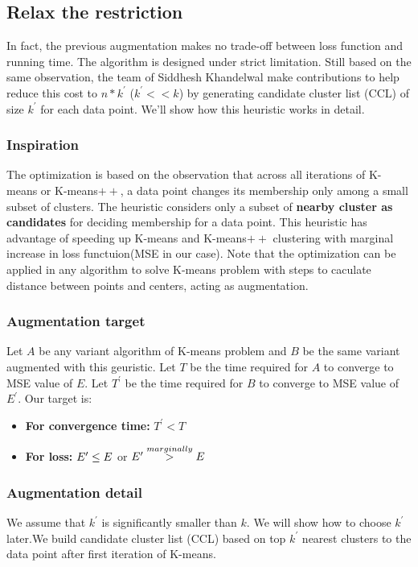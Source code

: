\documentclass[11pt]{article}
\begin{document}
\subsection{Relax the restriction}
In fact, the previous augmentation makes no trade-off between loss function and running time. The algorithm is designed under strict limitation. Still based on the same observation, the team of Siddhesh Khandelwal\cite{Faster} make contributions to help reduce this cost to $n * k^{\prime}$ ($k^{\prime} << k$) by generating candidate cluster list (CCL) of size $k^{\prime}$ for each data point. We'll show how this heuristic works in detail.
\subsubsection{Inspiration}
The optimization is based on the observation that across all iterations of K-means or K-means$++$, a data point changes its membership only among a small subset of clusters. The heuristic considers only a subset of \textbf{nearby cluster as candidates} for deciding membership for a data point. This heuristic has advantage of speeding up K-means and K-means$++$ clustering with marginal increase in loss functuion(MSE in our case). Note that the optimization can be applied in any algorithm to solve K-means problem with steps to caculate distance between points and centers, acting as augmentation.
\subsubsection{Augmentation target}
Let $A$ be any variant algorithm of K-means problem and $B$ be the same variant augmented with this geuristic. Let $T$ be the time required for $A$ to converge to MSE value of $E$. Let $T^{\prime}$ be the time required for $B$ to converge to MSE value of $E^{\prime}$. Our target is:
\begin{itemize}
\item \textbf{For convergence time:} $T^{\prime} < T$
\item \textbf{For loss:} $E^{\prime} \le E \space $ or $ \space E^{\prime} \overset{marginally}{>} E$
\end{itemize}

\subsubsection{Augmentation detail}
\par We assume that $k^{\prime}$ is significantly smaller than $k$. We will show how to choose $k^{\prime}$ later.We build candidate cluster list (CCL) based on top $k^{\prime}$ nearest clusters to the data point after first iteration of K-means. \par
\end{document}
